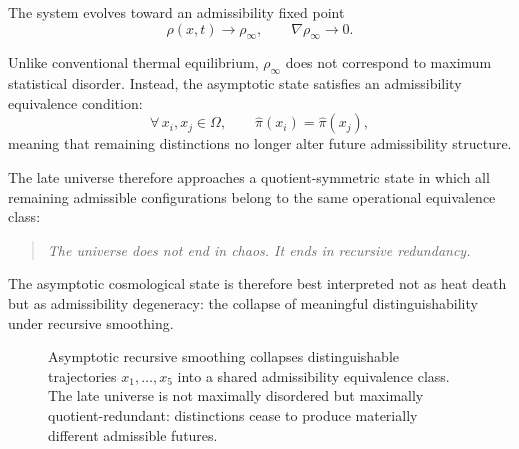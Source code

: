 \documentclass[12pt, a4paper]{article}
\newcommand{\proj}{\hat{\pi}}
\begin{document}
The system evolves toward an admissibility fixed point
\[
\rho(x,t) \to \rho_\infty, \qquad \nabla \rho_\infty \to 0.
\]

Unlike conventional thermal equilibrium, \(\rho_\infty\) does not correspond
to maximum statistical disorder. Instead, the asymptotic state satisfies an
admissibility equivalence condition:
\[
\forall\, x_i, x_j \in \Omega, \qquad \proj(x_i) = \proj(x_j),
\]
meaning that remaining distinctions no longer alter future admissibility
structure.

The late universe therefore approaches a quotient-symmetric state in which
all remaining admissible configurations belong to the same operational
equivalence class:

\begin{quote}
\itshape
The universe does not end in chaos.
It ends in recursive redundancy.
\end{quote}

The asymptotic cosmological state is therefore best interpreted not as heat
death but as admissibility degeneracy: the collapse of meaningful
distinguishability under recursive smoothing.

\begin{figure}[H]
\centering
{}
\caption{Asymptotic recursive smoothing collapses distinguishable
trajectories \(x_1,\ldots,x_5\) into a shared admissibility equivalence
class. The late universe is not maximally disordered but maximally
quotient-redundant: distinctions cease to produce materially different
admissible futures.}
\end{figure}
\end{document}
